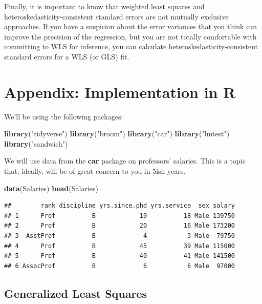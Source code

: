 \documentclass[12pt,oneside,openany]{book}
\newenvironment{Shaded}{\begin{snugshade}}{\end{snugshade}}
\newcommand{\KeywordTok}[1]{\textcolor[rgb]{0.13,0.29,0.53}{\textbf{{#1}}}}
\newcommand{\StringTok}[1]{\textcolor[rgb]{0.31,0.60,0.02}{{#1}}}
\newcommand{\NormalTok}[1]{{#1}}
\begin{document}
Finally, it is important to know that weighted least squares and
heteroskedasticity-consistent standard errors are not mutually exclusive
approaches. If you have a suspicion about the error variances that you
think can improve the precision of the regression, but you are not
totally comfortable with committing to WLS for inference, you can
calculate heteroskedasticity-consistent standard errors for a WLS (or
GLS) fit.

\section{Appendix: Implementation in
R}\label{appendix-implementation-in-r}

We'll be using the following packages:

\begin{Shaded}
\begin{Highlighting}[]
\KeywordTok{library}\NormalTok{(}\StringTok{"tidyverse"}\NormalTok{)}
\KeywordTok{library}\NormalTok{(}\StringTok{"broom"}\NormalTok{)}
\KeywordTok{library}\NormalTok{(}\StringTok{"car"}\NormalTok{)}
\KeywordTok{library}\NormalTok{(}\StringTok{"lmtest"}\NormalTok{)}
\KeywordTok{library}\NormalTok{(}\StringTok{"sandwich"}\NormalTok{)}
\end{Highlighting}
\end{Shaded}

We will use data from the \textbf{car} package on professors' salaries.
This is a topic that, ideally, will be of great concern to you in 5ish
years.

\begin{Shaded}
\begin{Highlighting}[]
\KeywordTok{data}\NormalTok{(Salaries)}
\KeywordTok{head}\NormalTok{(Salaries)}
\end{Highlighting}
\end{Shaded}

\begin{verbatim}
##        rank discipline yrs.since.phd yrs.service  sex salary
## 1      Prof          B            19          18 Male 139750
## 2      Prof          B            20          16 Male 173200
## 3  AsstProf          B             4           3 Male  79750
## 4      Prof          B            45          39 Male 115000
## 5      Prof          B            40          41 Male 141500
## 6 AssocProf          B             6           6 Male  97000
\end{verbatim}

\subsection{Generalized Least
Squares}\label{generalized-least-squares-1}
\end{document}
